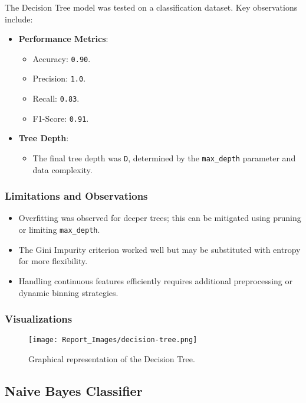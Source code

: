 \documentclass[12pt]{article}
\begin{document}
The Decision Tree model was tested on a classification dataset. Key observations include:

\begin{itemize}
    \item \textbf{Performance Metrics}:
    \begin{itemize}
       \item Accuracy: \texttt{0.90}.
    \item Precision: \texttt{1.0}.
    \item Recall: \texttt{0.83}.
    \item F1-Score: \texttt{0.91}.
    \end{itemize}

    \item \textbf{Tree Depth}:
    \begin{itemize}
        \item The final tree depth was \texttt{D}, determined by the \texttt{max\_depth} parameter and data complexity.
    \end{itemize}
\end{itemize}

\subsubsection{Limitations and Observations}

\begin{itemize}
    \item Overfitting was observed for deeper trees; this can be mitigated using pruning or limiting \texttt{max\_depth}.
    \item The Gini Impurity criterion worked well but may be substituted with entropy for more flexibility.
    \item Handling continuous features efficiently requires additional preprocessing or dynamic binning strategies.
\end{itemize}

\subsubsection{Visualizations}

\begin{figure}[h!]
\centering
\texttt{[image: Report\_Images/decision-tree.png]}
\caption{Graphical representation of the Decision Tree.}
\label{fig:decision_tree}
\end{figure}


\subsection{Naive Bayes Classifier}
\end{document}
